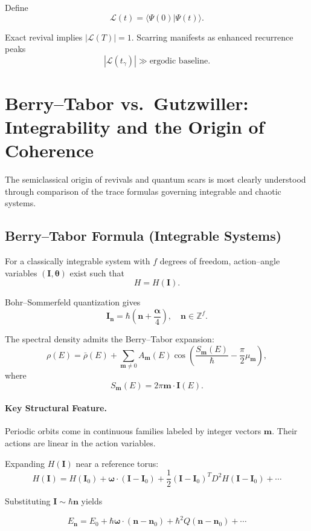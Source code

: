 \documentclass[11pt]{article}
\begin{document}
Define
\[
\mathcal{L}(t)=\langle\Psi(0)|\Psi(t)\rangle.
\]

Exact revival implies $|\mathcal{L}(T)|=1$.
Scarring manifests as enhanced recurrence peaks
\[
|\mathcal{L}(t_\gamma)| \gg \text{ergodic baseline}.
\]

\section{Berry--Tabor vs.\ Gutzwiller: Integrability and the Origin of Coherence}

The semiclassical origin of revivals and quantum scars is most clearly 
understood through comparison of the trace formulas governing integrable 
and chaotic systems.

\subsection{Berry--Tabor Formula (Integrable Systems)}

For a classically integrable system with $f$ degrees of freedom, 
action--angle variables $(\mathbf{I},\boldsymbol{\theta})$ exist such that
\[
H = H(\mathbf{I}).
\]

Bohr--Sommerfeld quantization gives
\[
\mathbf{I}_\mathbf{n} = \hbar \left( \mathbf{n} + \frac{\boldsymbol{\alpha}}{4} \right),
\quad \mathbf{n}\in\mathbb{Z}^f.
\]

The spectral density admits the Berry--Tabor expansion:
\[
\rho(E)
=
\bar{\rho}(E)
+
\sum_{\mathbf{m}\neq 0}
A_{\mathbf{m}}(E)
\cos\!\left(
\frac{S_{\mathbf{m}}(E)}{\hbar}
-
\frac{\pi}{2}\mu_{\mathbf{m}}
\right),
\]
where
\[
S_{\mathbf{m}}(E) = 2\pi \mathbf{m}\cdot \mathbf{I}(E).
\]

\paragraph{Key Structural Feature.}
Periodic orbits come in continuous families labeled by integer vectors 
$\mathbf{m}$.  Their actions are linear in the action variables.

Expanding $H(\mathbf{I})$ near a reference torus:
\[
H(\mathbf{I}) 
=
H(\mathbf{I}_0)
+
\boldsymbol{\omega}\cdot(\mathbf{I}-\mathbf{I}_0)
+
\frac12(\mathbf{I}-\mathbf{I}_0)^T D^2H (\mathbf{I}-\mathbf{I}_0)
+\cdots
\]

Substituting $\mathbf{I}\sim\hbar \mathbf{n}$ yields

\[
E_\mathbf{n}
=
E_0
+
\hbar \boldsymbol{\omega}\cdot(\mathbf{n}-\mathbf{n}_0)
+
\hbar^2 Q(\mathbf{n}-\mathbf{n}_0)
+\cdots
\]
\end{document}
